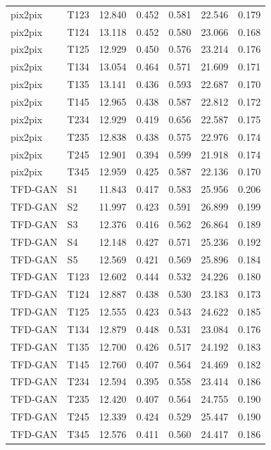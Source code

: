 \begin{longtable}{@{}llrrrrr@{}}
pix2pix & T123 & 12.840 & 0.452 & 0.581 & 22.546 & 0.179\\
pix2pix & T124 & 13.118 & 0.452 & 0.580 & 23.066 & 0.168\\
pix2pix & T125 & 12.929 & 0.450 & 0.576 & 23.214 & 0.176\\
pix2pix & T134 & 13.054 & 0.464 & 0.571 & 21.609 & 0.171\\
pix2pix & T135 & 13.141 & 0.436 & 0.593 & 22.687 & 0.170\\
pix2pix & T145 & 12.965 & 0.438 & 0.587 & 22.812 & 0.172\\
pix2pix & T234 & 12.929 & 0.419 & 0.656 & 22.587 & 0.175\\
pix2pix & T235 & 12.838 & 0.438 & 0.575 & 22.976 & 0.174\\
pix2pix & T245 & 12.901 & 0.394 & 0.599 & 21.918 & 0.174\\
pix2pix & T345 & 12.959 & 0.425 & 0.587 & 22.136 & 0.170\\
TFD-GAN & S1 & 11.843 & 0.417 & 0.583 & 25.956 & 0.206\\
TFD-GAN & S2 & 11.997 & 0.423 & 0.591 & 26.899 & 0.199\\
TFD-GAN & S3 & 12.376 & 0.416 & 0.562 & 26.864 & 0.189\\
TFD-GAN & S4 & 12.148 & 0.427 & 0.571 & 25.236 & 0.192\\
TFD-GAN & S5 & 12.569 & 0.421 & 0.569 & 25.896 & 0.184\\
TFD-GAN & T123 & 12.602 & 0.444 & 0.532 & 24.226 & 0.180\\
TFD-GAN & T124 & 12.887 & 0.438 & 0.530 & 23.183 & 0.173\\
TFD-GAN & T125 & 12.555 & 0.423 & 0.543 & 24.622 & 0.185\\
TFD-GAN & T134 & 12.879 & 0.448 & 0.531 & 23.084 & 0.176\\
TFD-GAN & T135 & 12.700 & 0.426 & 0.517 & 24.192 & 0.183\\
TFD-GAN & T145 & 12.760 & 0.407 & 0.564 & 24.469 & 0.182\\
TFD-GAN & T234 & 12.594 & 0.395 & 0.558 & 23.414 & 0.186\\
TFD-GAN & T235 & 12.420 & 0.407 & 0.564 & 24.755 & 0.190\\
TFD-GAN & T245 & 12.339 & 0.424 & 0.529 & 25.447 & 0.190\\
TFD-GAN & T345 & 12.576 & 0.411 & 0.560 & 24.417 & 0.186\\
\end{longtable}

